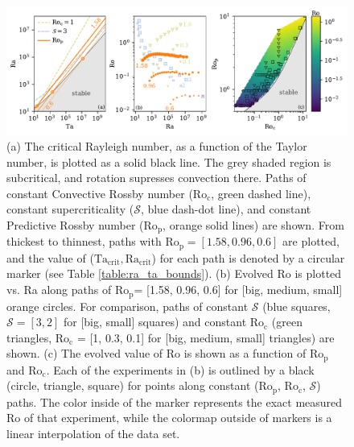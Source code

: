 \documentclass[twocolumn, amsmath, amsfonts, amssymb, trackchanges]{aastex62}
\newcommand{\pro}{\ensuremath{\text{Ro}_{\text{p}}}}
\newcommand{\con}{\ensuremath{\text{Ro}_{\text{c}}}}
\begin{document}
\begin{figure}[t!]
    \includegraphics[width=\textwidth]{parameter_space.pdf}
    \caption{(a) The critical Rayleigh number, as a function of the Taylor number, 
    is plotted as a solid black line. The grey shaded region is subcritical, and rotation
    supresses convection there. Paths of constant Convective Rossby number
    ($\con$, green dashed line), constant supercriticality ($\mathcal{S}$, blue dash-dot line), and 
    constant Predictive Rossby number (\pro, orange solid lines) are shown. 
	From thickest to thinnest, paths with $\pro = [1.58, 0.96, 0.6]$ are plotted,
	and the value of
	($\text{Ta}_{\text{crit}}, \text{Ra}_{\text{crit}}$) for each path is denoted by a
	circular marker (see Table \ref{table:ra_ta_bounds}).
    (b) Evolved Ro is plotted vs. Ra along paths of \pro = [1.58, 0.96, 0.6] for [big, medium, small] orange circles.
    For comparison, paths of constant $\mathcal{S}$ (blue squares, $\mathcal{S} = [3,2]$ 
    for [big, small] squares)
    and constant $\con$ (green triangles, $\con$ = [1, 0.3, 0.1] for [big, medium, small] triangles) are shown.
    (c) The evolved value of Ro is shown as a function of $\pro$ and $\con$. 
	Each of the experiments in (b) is outlined by a black (circle, triangle, square)
	for points along constant (\pro, \con, $\mathcal{S}$) paths.
	The color inside of the marker represents the exact measured Ro of that experiment, 
	while the colormap outside of markers is a linear interpolation
	of the data set. 
    \label{fig:parameter_space} }
\end{figure}
\end{document}

